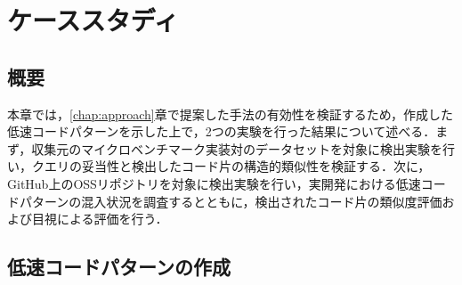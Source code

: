\documentclass[11pt]{jreport}
\begin{document}
\chapter{ケーススタディ}
\label{chap:case-study}

\section{概要}

本章では，\ref{chap:approach}章で提案した手法の有効性を検証するため，作成した低速コードパターンを示した上で，2つの実験を行った結果について述べる．まず，収集元のマイクロベンチマーク実装対のデータセットを対象に検出実験を行い，クエリの妥当性と検出したコード片の構造的類似性を検証する．次に，GitHub上のOSSリポジトリを対象に検出実験を行い，実開発における低速コードパターンの混入状況を調査するとともに，検出されたコード片の類似度評価および目視による評価を行う．


\section{低速コードパターンの作成}
\end{document}

